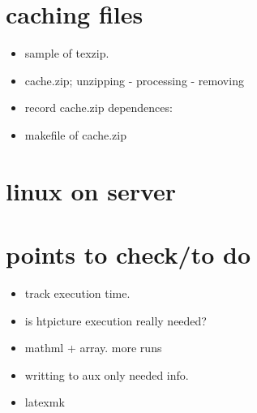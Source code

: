\documentclass{article}
\begin{document}
\section{caching files}
\begin{itemize}
\item sample of texzip. 
\item cache.zip; unzipping - processing - removing
\item record cache.zip dependences: 
\item makefile of cache.zip 
\end{itemize}
\section{linux on server}
\section{points to check/to do}
\begin{itemize}
\item track execution time.
\item is htpicture execution really needed?
\item mathml + array. more runs
\item writting to aux only needed info.
\item latexmk  
\end{itemize}
\end{document}
